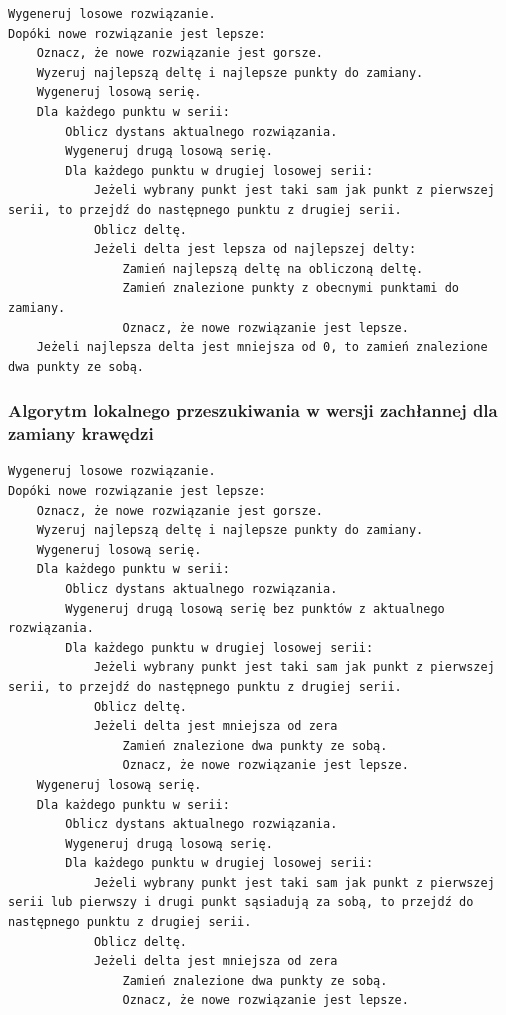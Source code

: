 \documentclass[a4paper]{article}
\begin{document}
\begin{lstlisting}
Wygeneruj losowe rozwiązanie.
Dopóki nowe rozwiązanie jest lepsze:
    Oznacz, że nowe rozwiązanie jest gorsze.
    Wyzeruj najlepszą deltę i najlepsze punkty do zamiany.
    Wygeneruj losową serię.
    Dla każdego punktu w serii:
        Oblicz dystans aktualnego rozwiązania.
        Wygeneruj drugą losową serię.
        Dla każdego punktu w drugiej losowej serii:
            Jeżeli wybrany punkt jest taki sam jak punkt z pierwszej serii, to przejdź do następnego punktu z drugiej serii.
            Oblicz deltę.
            Jeżeli delta jest lepsza od najlepszej delty:
                Zamień najlepszą deltę na obliczoną deltę.
                Zamień znalezione punkty z obecnymi punktami do zamiany.
                Oznacz, że nowe rozwiązanie jest lepsze.
    Jeżeli najlepsza delta jest mniejsza od 0, to zamień znalezione dwa punkty ze sobą.
\end{lstlisting}

\subsubsection{Algorytm lokalnego przeszukiwania w wersji zachłannej dla zamiany krawędzi}

\begin{lstlisting}
Wygeneruj losowe rozwiązanie.
Dopóki nowe rozwiązanie jest lepsze:
    Oznacz, że nowe rozwiązanie jest gorsze.
    Wyzeruj najlepszą deltę i najlepsze punkty do zamiany.
    Wygeneruj losową serię.
    Dla każdego punktu w serii:
        Oblicz dystans aktualnego rozwiązania.
        Wygeneruj drugą losową serię bez punktów z aktualnego rozwiązania.
        Dla każdego punktu w drugiej losowej serii:
            Jeżeli wybrany punkt jest taki sam jak punkt z pierwszej serii, to przejdź do następnego punktu z drugiej serii.
            Oblicz deltę.
            Jeżeli delta jest mniejsza od zera
                Zamień znalezione dwa punkty ze sobą.
                Oznacz, że nowe rozwiązanie jest lepsze.
    Wygeneruj losową serię.
    Dla każdego punktu w serii:
        Oblicz dystans aktualnego rozwiązania.
        Wygeneruj drugą losową serię.
        Dla każdego punktu w drugiej losowej serii:
            Jeżeli wybrany punkt jest taki sam jak punkt z pierwszej serii lub pierwszy i drugi punkt sąsiadują za sobą, to przejdź do następnego punktu z drugiej serii.
            Oblicz deltę.
            Jeżeli delta jest mniejsza od zera
                Zamień znalezione dwa punkty ze sobą.
                Oznacz, że nowe rozwiązanie jest lepsze.
\end{lstlisting}
\end{document}

